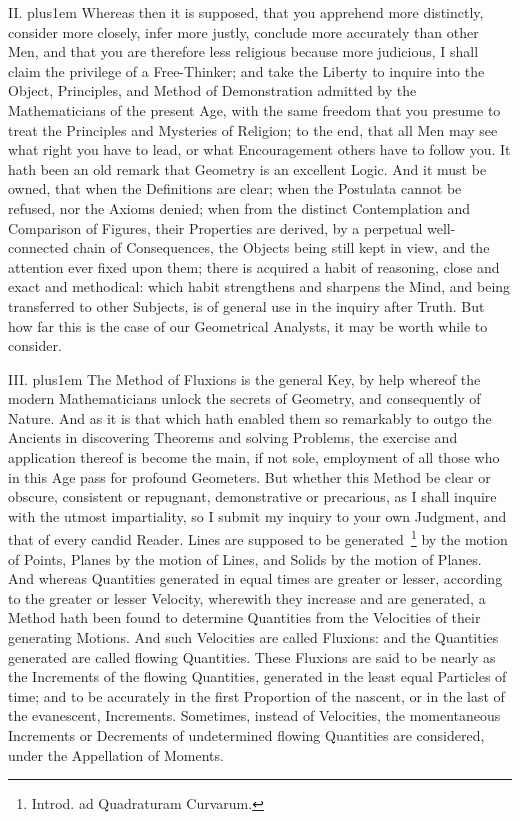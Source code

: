 \medbreak

II. \hskip 0pt plus1em
Whereas then it is supposed, that you apprehend more distinctly,
consider more closely, infer more justly, conclude more
accurately than other Men, and that you are therefore less
religious because more judicious, I shall claim the privilege of
a Free-Thinker; and take the Liberty to inquire into the Object,
Principles, and Method of Demonstration admitted by the
Mathematicians of the present Age, with the same freedom that you
presume to treat the Principles and Mysteries of Religion; to the
end, that all Men may see what right you have to lead, or what
Encouragement others have to follow you.  It hath been an old
remark that Geometry is an excellent Logic.  And it must be
owned, that when the Definitions are clear; when the Postulata
cannot be refused, nor the Axioms denied; when from the distinct
Contemplation and Comparison of Figures, their Properties are
derived, by a perpetual well-connected chain of Consequences, the
Objects being still kept in view, and the attention ever fixed
upon them; there is acquired a habit of reasoning, close and
exact and methodical: which habit strengthens and sharpens the
Mind, and being transferred to other Subjects, is of general use
in the inquiry after Truth.  But how far this is the case of our
Geometrical Analysts, it may be worth while to consider.

\medbreak

III. \hskip 0pt plus1em
The Method of Fluxions is the general Key, by help whereof the
modern Mathematicians unlock the secrets of Geometry, and
consequently of Nature.  And as it is that which hath enabled
them so remarkably to outgo the Ancients in discovering Theorems
and solving Problems, the exercise and application thereof is
become the main, if not sole, employment of all those who in this
Age pass for profound Geometers.  But whether this Method be
clear or obscure, consistent or repugnant, demonstrative or
precarious, as I shall inquire with the utmost impartiality, so I
submit my inquiry to your own Judgment, and that of every candid
Reader.  Lines are supposed to be generated~\footnote*{Introd. ad
Quadraturam Curvarum.}
by the motion of Points, Planes by the motion of Lines, and
Solids by the motion of Planes.  And whereas Quantities generated
in equal times are greater or lesser, according to the greater or
lesser Velocity, wherewith they increase and are generated, a
Method hath been found to determine Quantities from the
Velocities of their generating Motions.  And such Velocities are
called Fluxions: and the Quantities generated are called flowing
Quantities.  These Fluxions are said to be nearly as the
Increments of the flowing Quantities, generated in the least
equal Particles of time; and to be accurately in the first
Proportion of the nascent, or in the last of the evanescent,
Increments.  Sometimes, instead of Velocities, the momentaneous
Increments or Decrements of undetermined flowing Quantities are
considered, under the Appellation of Moments.

